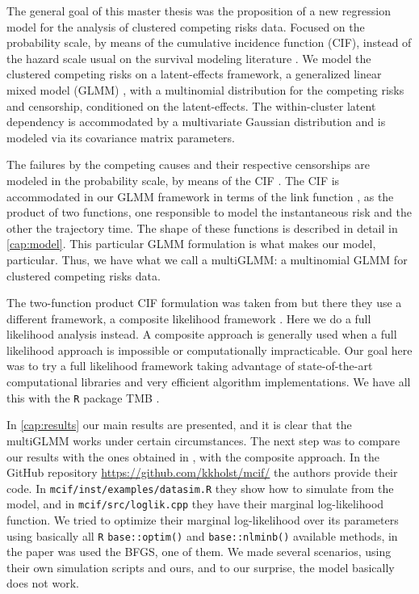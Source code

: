 The general goal of this master thesis was the proposition of a new
regression model for the analysis of clustered competing risks
data. Focused on the probability scale, by means of the cumulative
incidence function (CIF), instead of the hazard scale usual on the
survival modeling literature \cite{kalb&prentice}. We model the
clustered competing risks on a latent-effects framework, a generalized
linear mixed model (GLMM) \cite{GLMM}, with a multinomial distribution
for the competing risks and censorship, conditioned on the
latent-effects. The within-cluster latent dependency is accommodated by
a multivariate Gaussian distribution and is modeled via its covariance
matrix parameters.

The failures by the competing causes and their respective censorships
are modeled in the probability scale, by means of the CIF
\cite{kalb&prentice, andersen12}. The CIF is accommodated in our GLMM
framework in terms of the link function \cite{GLM89}, as the product of
two functions, one responsible to model the instantaneous risk and the
other the trajectory time. The shape of these functions is described in
detail in \autoref{cap:model}. This particular GLMM formulation is what
makes our model, particular. Thus, we have what we call a multiGLMM: a
multinomial GLMM for clustered competing risks data.

The two-function product CIF formulation was taken from
 but there they use a different framework, a
composite likelihood framework \cite{lindsay88, cox&reid04, varin11}.
Here we do a full likelihood analysis instead. A composite approach is
generally used when a full likelihood approach is impossible or
computationally impracticable. Our goal here was to try a full
likelihood framework taking advantage of state-of-the-art computational
libraries and very efficient algorithm implementations. We have all this
with the \texttt{R} \cite{R21} package TMB \cite{TMB}.

In \autoref{cap:results} our main results are presented, and it is clear
that the multiGLMM works under certain circumstances. The next step was
to compare our results with the ones obtained in ,
with the composite approach. In the GitHub repository
\url{https://github.com/kkholst/mcif/} the authors provide their code.
In \texttt{mcif/inst/examples/datasim.R} they show how to simulate from
the model, and in \texttt{mcif/src/loglik.cpp} they have their marginal
log-likelihood function. We tried to optimize their marginal
log-likelihood over its parameters using basically all \texttt{R}
\texttt{base::optim()} and \texttt{base::nlminb()} available methods, in
the paper was used the BFGS, one of them. We made several scenarios,
using their own simulation scripts and ours, and to our surprise, the
model basically does not work.


